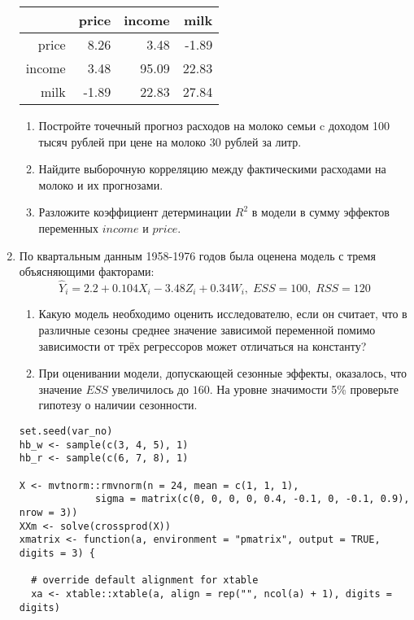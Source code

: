 \documentclass[12pt, a4paper]{article}
\theoremstyle{definition}
\begin{document}
\begin{enumerate}
\begin{tabular}{rrrr}
  \hline
 & price & income & milk \\
  \hline
price & 8.26 & 3.48 & -1.89 \\
  income & 3.48 & 95.09 & 22.83 \\
  milk & -1.89 & 22.83 & 27.84 \\
   \hline
\end{tabular}



\begin{enumerate}
\item Постройте точечный прогноз расходов на молоко семьи c доходом 100 тысяч рублей при цене на молоко 30 рублей за литр.
\item Найдите выборочную корреляцию между фактическими расходами на молоко и их прогнозами.
\item Разложите коэффициент детерминации $R^2$ в модели в сумму эффектов переменных $income$ и $price$.
\end{enumerate}


\item По квартальным данным 1958-1976 годов была оценена модель с тремя объясняющими факторами:
\[
\hat Y_i = 2.2 + 0.104 X_i - 3.48 Z_i + 0.34 W_i, \; ESS = 100, \; RSS = 120
\]

\begin{enumerate}
\item Какую модель необходимо оценить исследователю, если он считает, что в различные сезоны среднее значение зависимой переменной помимо зависимости от трёх регрессоров может отличаться на константу?
\item При оценивании модели, допускающей сезонные эффекты, оказалось, что значение $ESS$ увеличилось до $160$.
На уровне значимости 5\% проверьте гипотезу о наличии сезонности.
\end{enumerate}

\begin{verbatim}
set.seed(var_no)
hb_w <- sample(c(3, 4, 5), 1)
hb_r <- sample(c(6, 7, 8), 1)

X <- mvtnorm::rmvnorm(n = 24, mean = c(1, 1, 1),
             sigma = matrix(c(0, 0, 0, 0, 0.4, -0.1, 0, -0.1, 0.9), nrow = 3))
XXm <- solve(crossprod(X))
xmatrix <- function(a, environment = "pmatrix", output = TRUE, digits = 3) {

  # override default alignment for xtable
  xa <- xtable::xtable(a, align = rep("", ncol(a) + 1), digits = digits)


\end{verbatim}
\end{enumerate}
\end{document}
